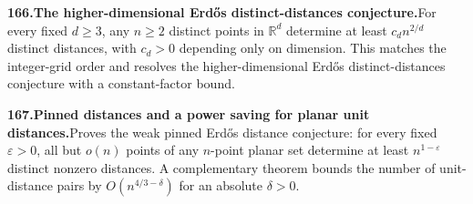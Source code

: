 \documentclass[11pt,a4paper]{article}
\begin{document}
  \par \begin{minipage}{\linewidth}
  \fontsize{10.5}{12.6}\selectfont\RaggedRight
  \hypertarget{result 166}{}
  {\bfseries\textcolor{muted}{166.}\enspace The higher-dimensional Erd\H{o}s distinct-distances conjecture.}\enspace For every fixed $d\ge3$, any $n\ge2$ distinct points in $\mathbb R^d$ determine at least $c_dn^{2/d}$ distinct distances, with $c_d>0$ depending only on dimension. This matches the integer-grid order and resolves the higher-dimensional Erd\H{o}s distinct-distances conjecture with a constant-factor bound.\par
  \end{minipage}\par\vspace{5pt}



  \par \begin{minipage}{\linewidth}
  \fontsize{10.5}{12.6}\selectfont\RaggedRight
  \hypertarget{result 167}{}
  {\bfseries\textcolor{muted}{167.}\enspace Pinned distances and a power saving for planar unit distances.}\enspace Proves the weak pinned Erd\H{o}s distance conjecture: for every fixed $\varepsilon>0$, all but $o(n)$ points of any $n$-point planar set determine at least $n^{1-\varepsilon}$ distinct nonzero distances. A complementary theorem bounds the number of unit-distance pairs by $O(n^{4/3-\delta})$ for an absolute $\delta>0$.\par
  \end{minipage}\par\vspace{5pt}
\end{document}
